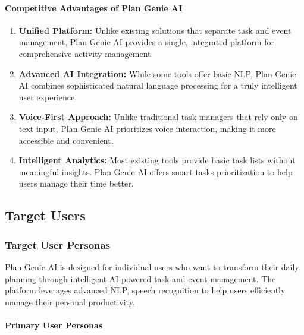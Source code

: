 \documentclass[12pt,a4paper]{article}
\begin{document}
\paragraph{Competitive Advantages of Plan Genie AI}

\begin{enumerate}
    \item \textbf{Unified Platform:} Unlike existing solutions that separate task and event management, Plan Genie AI provides a single, integrated platform for comprehensive activity management.
    
    \item \textbf{Advanced AI Integration:} While some tools offer basic NLP, Plan Genie AI combines sophisticated natural language processing for a truly intelligent user experience.
    
    \item \textbf{Voice-First Approach:} Unlike traditional task managers that rely only on text input, Plan Genie AI prioritizes voice interaction, making it more accessible and convenient.
    
    \item \textbf{Intelligent Analytics:} Most existing tools provide basic task lists without meaningful insights. Plan Genie AI offers smart tasks prioritization to help users manage their time better.
\end{enumerate}

\subsection{Target Users}

\subsubsection{Target User Personas}

Plan Genie AI is designed for individual users who want to transform their daily planning through intelligent AI-powered task and event management. The platform leverages advanced NLP, speech recognition to help users efficiently manage their personal productivity.

\paragraph{Primary User Personas}
\end{document}
